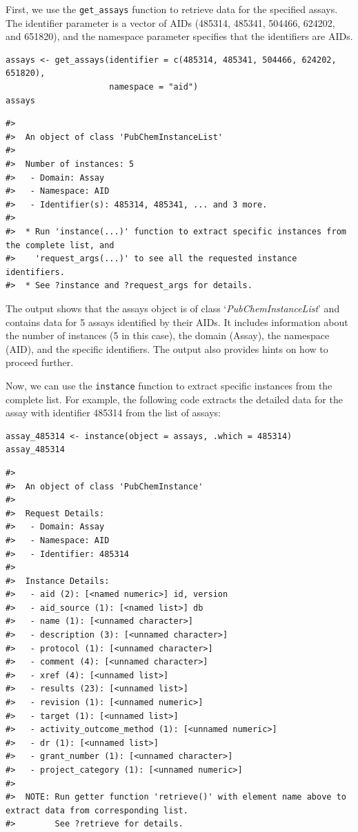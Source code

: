 First, we use the \texttt{get\_assays} function to retrieve data for the specified assays. The identifier parameter is a vector of AIDs (485314, 485341, 504466, 624202, and 651820), and the namespace parameter specifies that the identifiers are AIDs.

\begin{verbatim}
assays <- get_assays(identifier = c(485314, 485341, 504466, 624202, 651820), 
                     namespace = "aid") 
assays
\end{verbatim}

\begin{verbatim}
#> 
#>  An object of class 'PubChemInstanceList'
#> 
#>  Number of instances: 5
#>   - Domain: Assay
#>   - Namespace: AID
#>   - Identifier(s): 485314, 485341, ... and 3 more.
#> 
#>  * Run 'instance(...)' function to extract specific instances from the complete list, and
#>    'request_args(...)' to see all the requested instance identifiers.
#>  * See ?instance and ?request_args for details.
\end{verbatim}

The output shows that the assays object is of class `\emph{PubChemInstanceList}' and contains data for 5 assays identified by their AIDs. It includes information about the number of instances (5 in this case), the domain (Assay), the namespace (AID), and the specific identifiers. The output also provides hints on how to proceed further.

Now, we can use the \texttt{instance} function to extract specific instances from the complete list. For example, the following code extracts the detailed data for the assay with identifier 485314 from the list of assays:

\begin{verbatim}
assay_485314 <- instance(object = assays, .which = 485314)
assay_485314
\end{verbatim}

\begin{verbatim}
#> 
#>  An object of class 'PubChemInstance'
#> 
#>  Request Details:  
#>   - Domain: Assay
#>   - Namespace: AID
#>   - Identifier: 485314
#> 
#>  Instance Details:  
#>   - aid (2): [<named numeric>] id, version
#>   - aid_source (1): [<named list>] db
#>   - name (1): [<unnamed character>] 
#>   - description (3): [<unnamed character>] 
#>   - protocol (1): [<unnamed character>] 
#>   - comment (4): [<unnamed character>] 
#>   - xref (4): [<unnamed list>] 
#>   - results (23): [<unnamed list>] 
#>   - revision (1): [<unnamed numeric>] 
#>   - target (1): [<unnamed list>] 
#>   - activity_outcome_method (1): [<unnamed numeric>] 
#>   - dr (1): [<unnamed list>] 
#>   - grant_number (1): [<unnamed character>] 
#>   - project_category (1): [<unnamed numeric>] 
#> 
#>  NOTE: Run getter function 'retrieve()' with element name above to extract data from corresponding list. 
#>        See ?retrieve for details.
\end{verbatim}


